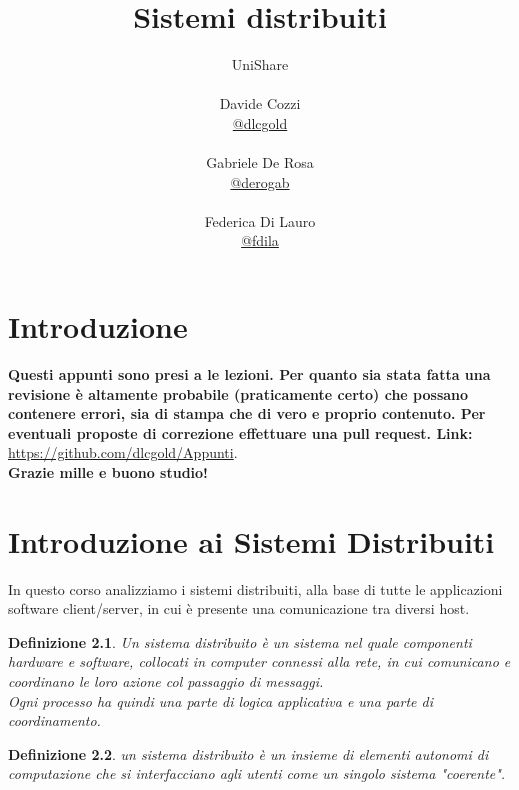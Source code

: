 \documentclass[a4paper,12pt, oneside]{book}
\title{Sistemi distribuiti}
\author{UniShare\\\\Davide Cozzi\\\href{https://t.me/dlcgold}{@dlcgold}\\\\Gabriele De Rosa\\\href{https://t.me/derogab}{@derogab} \\\\Federica Di Lauro\\\href{https://t.me/f_dila}{@f\textunderscore dila}}
\date{}
\begin{document}
\maketitle


\newtheorem{teorema}{Teorema}
\newtheorem{definizione}{Definizione}
\newtheorem{esempio}{Esempio}
\newtheorem{corollario}{Corollario}
\newtheorem{lemma}{Lemma}
\newtheorem{osservazione}{Osservazione}
\newtheorem{nota}{Nota}
\newtheorem{esercizio}{Esercizio}
\tableofcontents
\renewcommand{\chaptermark}[1]{%
	\markboth{\chaptername
		\ \thechapter.\ #1}{}}
\renewcommand{\sectionmark}[1]{\markright{\thesection.\ #1}}
\chapter{Introduzione}
\textbf{Questi appunti sono presi a le lezioni. Per quanto sia stata fatta una revisione è altamente probabile (praticamente certo) che possano contenere errori, sia di stampa che di vero e proprio contenuto. Per eventuali proposte di correzione effettuare una pull request. Link: } \url{https://github.com/dlcgold/Appunti}.\\
\textbf{Grazie mille e buono studio!}
\chapter{Introduzione ai Sistemi Distribuiti}
In questo corso analizziamo i sistemi distribuiti, alla base di tutte le applicazioni software 
client/server, in cui è presente una comunicazione tra diversi host.

\begin{definizione}
Un sistema distribuito è un sistema nel quale componenti hardware e software, collocati in computer
connessi alla rete, in cui comunicano e coordinano le loro azione  col passaggio di messaggi.\\
Ogni processo ha quindi una parte di logica applicativa e una parte di coordinamento. 
\end{definizione}

\begin{definizione}
un sistema distribuito è un insieme di elementi autonomi di computazione che si 
interfacciano agli utenti come un singolo sistema "coerente".
\end{definizione}
\end{document}
